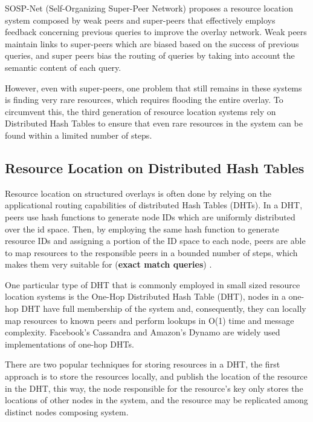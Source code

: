 SOSP-Net \cite{garbacki2007optimizing}  (Self-Organizing Super-Peer Network) proposes a resource location system composed by weak peers and super-peers that effectively employs feedback concerning previous queries to improve the overlay network. Weak peers maintain links to super-peers which are biased based on the success of previous queries, and super peers bias the routing of queries by taking into account the semantic content of each query. 

However, even with super-peers, one problem that still remains in these systems is finding very rare resources, which requires flooding the entire overlay. To circumvent this, the third generation of resource location systems rely on Distributed Hash Tables to ensure that even rare resources in the system can be found within a limited number of steps.

\subsection{Resource Location on Distributed Hash Tables}

Resource location on structured overlays is often done by relying on the applicational routing capabilities of distributed Hash Tables (DHTs). In a DHT, peers use hash functions to generate node IDs which are uniformly distributed over the id space. Then, by employing the same hash function to generate resource IDs and assigning a portion of the ID space to each node, peers are able to map resources to the responsible peers in a bounded number of steps, which makes them very suitable for (\textbf{exact match queries}) \cite{leitaoPHDthesis}. 

One particular type of DHT that is commonly employed in small sized resource location systems is the One-Hop Distributed Hash Table (DHT), nodes in a one-hop DHT have full membership of the system and, consequently, they can locally map resources to known peers and perform lookups in O(1) time and message complexity. Facebook's Cassandra \cite{lakshman2010cassandra} and Amazon's Dynamo \cite{decandia2007dynamo} are widely used implementations of one-hop DHTs. 

There are two popular techniques for storing resources in a DHT, the first approach is to store the resources locally, and publish the location of the resource in the DHT, this way, the node responsible for the resource's key only stores the locations of other nodes in the system, and the resource may be replicated among distinct nodes composing system. 


